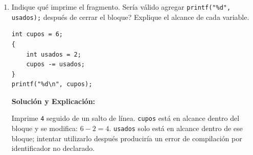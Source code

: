 \documentclass[11pt,letterpaper]{article}
\begin{document}
\begin{enumerate}[label=\textbf{\arabic*.}]
\begin{enumerate}[label=(\alph*)]
\begin{solucionbox}
        \end{solucionbox}
        \item Indique qué imprime el fragmento. \textquestiondown{}Sería válido agregar \texttt{printf("\%d", usados);} después de cerrar el bloque? Explique el alcance de cada variable.
        \begin{lstlisting}[style=customc]
int cupos = 6;
{
    int usados = 2;
    cupos -= usados;
}
printf("%d\n", cupos);
        \end{lstlisting}
        \begin{solucionbox}
        \textbf{Solución y Explicación:}\par
        Imprime \texttt{4} seguido de un salto de línea. \texttt{cupos} está en alcance dentro del bloque y se modifica: $6-2=4$. \texttt{usados} solo está en alcance dentro de ese bloque; intentar utilizarlo después produciría un error de compilación por identificador no declarado.
        \end{solucionbox}
    \end{enumerate}


\end{enumerate}
\end{document}
